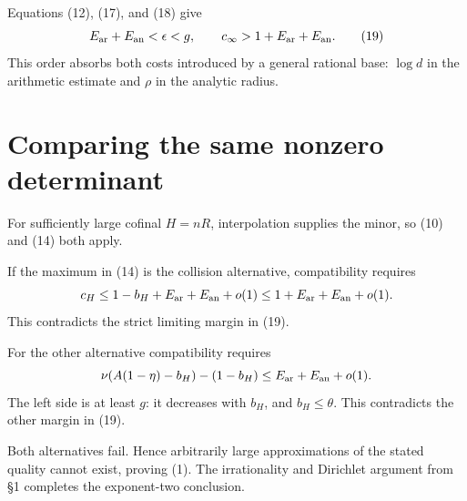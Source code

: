 Equations (12), (17), and (18) give
\[
E_{\rm ar}+E_{\rm an}<\epsilon<g,\qquad
c_\infty>1+E_{\rm ar}+E_{\rm an}.
\tag{19}
\]
This order absorbs both costs introduced by a general rational base: \(\log d\) in the arithmetic estimate and \(\rho\) in the analytic radius.

\section{Comparing the same nonzero determinant}

For sufficiently large cofinal \(H=nR\), interpolation supplies the minor, so (10) and (14) both apply.

If the maximum in (14) is the collision alternative, compatibility requires
\[
c_H\le1-b_H+E_{\rm ar}+E_{\rm an}+o(1)
\le1+E_{\rm ar}+E_{\rm an}+o(1).
\]
This contradicts the strict limiting margin in (19).

For the other alternative compatibility requires
\[
\nu(A(1-\eta)-b_H)-(1-b_H)
\le E_{\rm ar}+E_{\rm an}+o(1).
\]
The left side is at least \(g\): it decreases with \(b_H\), and \(b_H\le\theta\). This contradicts the other margin in (19).

Both alternatives fail. Hence arbitrarily large approximations of the stated quality cannot exist, proving (1). The irrationality and Dirichlet argument from §1 completes the exponent-two conclusion.
